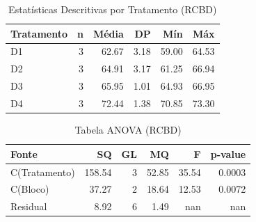 \begin{table}[H]
\centering
\caption{Estatísticas Descritivas por Tratamento (RCBD)}
\label{tab:descritivas_rcbd}
\begin{tabular}{|l|r|r|r|r|r|}
\hline
\textbf{Tratamento} & \textbf{n} & \textbf{Média} & \textbf{DP} & \textbf{Mín} & \textbf{Máx} \\
\hline
D1 & 3 & 62.67 & 3.18 & 59.00 & 64.53 \\
D2 & 3 & 64.91 & 3.17 & 61.25 & 66.94 \\
D3 & 3 & 65.95 & 1.01 & 64.93 & 66.95 \\
D4 & 3 & 72.44 & 1.38 & 70.85 & 73.30 \\
\hline
\end{tabular}
\end{table}

\begin{table}[H]
\centering
\caption{Tabela ANOVA (RCBD)}
\label{tab:anova_rcbd}
\begin{tabular}{|l|r|r|r|r|r|}
\hline
\textbf{Fonte} & \textbf{SQ} & \textbf{GL} & \textbf{MQ} & \textbf{F} & \textbf{p-value} \\
\hline
C(Tratamento) & 158.54 & 3 & 52.85 & 35.54 & 0.0003 \\
C(Bloco) & 37.27 & 2 & 18.64 & 12.53 & 0.0072 \\
Residual & 8.92 & 6 & 1.49 & nan & nan \\
\hline
\end{tabular}
\end{table}
